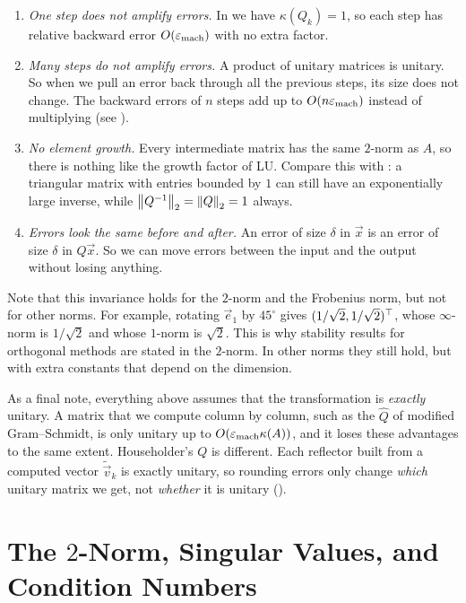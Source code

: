 \begin{enumerate}
  \item \emph{One step does not amplify errors.} In  we have $\kappa(Q_k) = 1$, so each step has relative backward error $O(\varepsilon_{\mathrm{mach}})$ with no extra factor.
  \item \emph{Many steps do not amplify errors.} A product of unitary matrices is unitary. So when we pull an error back through all the previous steps, its size does not change. The backward errors of $n$ steps add up to $O(n\varepsilon_{\mathrm{mach}})$ instead of multiplying (see ).
  \item \emph{No element growth.} Every intermediate matrix has the same $2$-norm as $A$, so there is nothing like the growth factor of LU. Compare this with : a triangular matrix with entries bounded by $1$ can still have an exponentially large inverse, while $\left\lVert Q^{-1} \right\rVert_2 = \left\lVert Q \right\rVert_2 = 1$ always.
  \item \emph{Errors look the same before and after.} An error of size $\delta$ in $\vec{x}$ is an error of size $\delta$ in $Q\vec{x}$. So we can move errors between the input and the output without losing anything.
\end{enumerate}

Note that this invariance holds for the $2$-norm and the Frobenius norm, but not for other norms. For example, rotating $\vec{e}_1$ by $45^\circ$ gives $(1/\sqrt{2}, 1/\sqrt{2})^\top$, whose $\infty$-norm is $1/\sqrt{2}$ and whose $1$-norm is $\sqrt{2}$. This is why stability results for orthogonal methods are stated in the $2$-norm. In other norms they still hold, but with extra constants that depend on the dimension.

As a final note, everything above assumes that the transformation is \emph{exactly} unitary. A matrix that we compute column by column, such as the $\hat{Q}$ of modified Gram--Schmidt, is only unitary up to $O(\varepsilon_{\mathrm{mach}}\kappa(A))$, and it loses these advantages to the same extent. Householder's $Q$ is different. Each reflector built from a computed vector $\tilde{\vec{v}}_k$ is exactly unitary, so rounding errors only change \emph{which} unitary matrix we get, not \emph{whether} it is unitary ().

\section{The $2$-Norm, Singular Values, and Condition Numbers}
\label{sec:twonorm}

